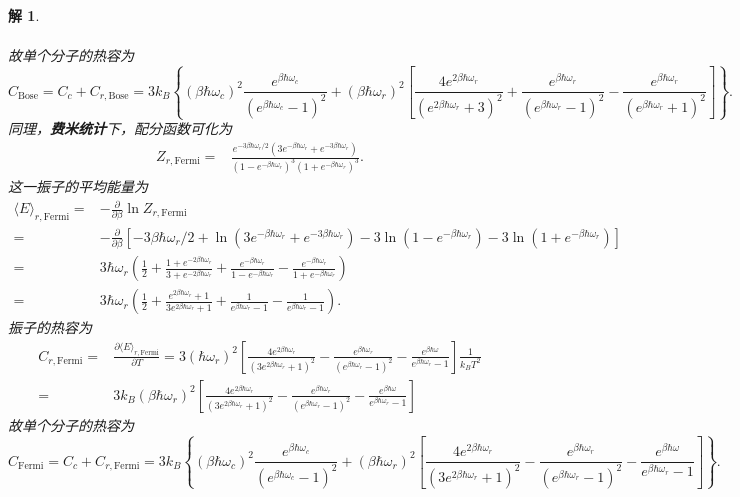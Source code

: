 \documentclass[UTF8,10pt,a4paper]{article}
\theoremstyle{Problem}
\theoremstyle{Solution}
\newtheorem*{sol}{解}
\begin{document}
\begin{sol}
\begin{itemize}
\begin{align}
        \end{align}
        故单个分子的热容为
        \begin{equation}
            C_{\text{Bose}}=C_c+C_{r,\text{Bose}}=3k_B\left\{(\beta\hbar\omega_c)^2\frac{e^{\beta\hbar\omega_c}}{(e^{\beta\hbar\omega_c}-1)^2}+\left(\beta\hbar\omega_r\right)^2\left[\frac{4e^{2\beta\hbar\omega_r}}{(e^{2\beta\hbar\omega_r}+3)^2}+\frac{e^{\beta\hbar\omega_r}}{(e^{\beta\hbar\omega_r}-1)^2}-\frac{e^{\beta\hbar\omega_r}}{(e^{\beta\hbar\omega_r}+1)^2}\right]\right\}.
        \end{equation}
        同理，\textbf{费米统计}下，配分函数可化为
        \begin{align}
            \nonumber Z_{r,\text{Fermi}}=&\frac{e^{-3\beta\hbar\omega_r/2}(3e^{-\beta\hbar\omega_r}+e^{-3\beta\hbar\omega_r})}{(1-e^{-\beta\hbar\omega_r})^3(1+e^{-\beta\hbar\omega_r})^3}.
        \end{align}
        这一振子的平均能量为
        \begin{align}
            \nonumber\langle E\rangle_{r,\text{Fermi}}=&-\frac{\partial}{\partial\beta}\ln Z_{r,\text{Fermi}}\\
            \nonumber=&-\frac{\partial}{\partial\beta}\left[-3\beta\hbar\omega_r/2+\ln(3e^{-\beta\hbar\omega_r}+e^{-3\beta\hbar\omega_r})-3\ln(1-e^{-\beta\hbar\omega_r})-3\ln(1+e^{-\beta\hbar\omega_r})\right]\\
            \nonumber=&3\hbar\omega_r\left(\frac{1}{2}+\frac{1+e^{-2\beta\hbar\omega_r}}{3+e^{-2\beta\hbar\omega_r}}+\frac{e^{-\beta\hbar\omega_r}}{1-e^{-\beta\hbar\omega_r}}-\frac{e^{-\beta\hbar\omega_r}}{1+e^{-\beta\hbar\omega_r}}\right)\\
            =&3\hbar\omega_r\left(\frac{1}{2}+\frac{e^{2\beta\hbar\omega_r}+1}{3e^{2\beta\hbar\omega_r}+1}+\frac{1}{e^{\beta\hbar\omega_r}-1}-\frac{1}{e^{\beta\hbar\omega_r}-1}\right).
        \end{align}
        振子的热容为
        \begin{align}
            \nonumber C_{r,\text{Fermi}}=&\frac{\partial\langle E\rangle_{r,\text{Fermi}}}{\partial T}=3(\hbar\omega_r)^2\left[\frac{4e^{2\beta\hbar\omega_r}}{(3e^{2\beta\hbar\omega_r}+1)^2}-\frac{e^{\beta\hbar\omega_r}}{(e^{\beta\hbar\omega_r}-1)^2}-\frac{e^{\beta\hbar\omega}}{e^{\beta\hbar\omega_r}-1}\right]\frac{1}{k_BT^2}\\
            =&3k_B(\beta\hbar\omega_r)^2\left[\frac{4e^{2\beta\hbar\omega_r}}{(3e^{2\beta\hbar\omega_r}+1)^2}-\frac{e^{\beta\hbar\omega_r}}{(e^{\beta\hbar\omega_r}-1)^2}-\frac{e^{\beta\hbar\omega}}{e^{\beta\hbar\omega_r}-1}\right]
        \end{align}
        故单个分子的热容为
        \begin{equation}
            C_{\text{Fermi}}=C_c+C_{r,\text{Fermi}}=3k_B\left\{(\beta\hbar\omega_c)^2\frac{e^{\beta\hbar\omega_c}}{(e^{\beta\hbar\omega_c}-1)^2}+(\beta\hbar\omega_r)^2\left[\frac{4e^{2\beta\hbar\omega_r}}{(3e^{2\beta\hbar\omega_r}+1)^2}-\frac{e^{\beta\hbar\omega_r}}{(e^{\beta\hbar\omega_r}-1)^2}-\frac{e^{\beta\hbar\omega}}{e^{\beta\hbar\omega_r}-1}\right]\right\}.
        \end{equation}
    \end{itemize}
\end{sol}
\end{document}
